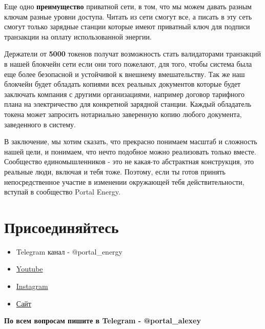 \documentclass[a4paper,12pt]{report}
\begin{document}
Еще одно \textbf{преимущество} приватной сети, в том, что мы можем давать разным ключам разные уровни доступа. Читать из сети смогут все, а писать в эту сеть смогут только зарядные станции которые имеют приватный ключ для подписи транзакции на оплату использованной энергии.

Держатели от \textbf{5000} токенов получат возможность стать валидаторами транзакций в нашей блокчейн сети если они того пожелают, для того, чтобы система была еще более безопасной и устойчивой к внешнему вмешательству. Так же наш блокчейн будет обладать копиями всех реальных документов которые будет заключать компания с другими организациями, например договор тарифного плана на электричество для конкретной зарядной станции.
Каждый обладатель токена может запросить нотариально заверенную копию любого документа, заведенного в систему.

В заключение, мы хотим сказать, что прекрасно понимаем масштаб и сложность нашей цели, и понимаем, что нечто подобное можно реализовать только вместе. Сообщество единомышленников - это не какая-то абстрактная конструкция, это реальные люди, включая и тебя тоже. Поэтому, если ты готов принять непосредственное участие в изменении окружающей тебя действительности, вступай в сообщество Portal Energy.


\chapter{Присоединяйтесь}

\begin{itemize}
	\item Telegram канал - @portal\_energy
	\item \href{https://www.youtube.com/channel/UCtPxyCkz73i78F9HChlO61w}{Youtube}
	\item \href{https://www.instagram.com/petr_roadrunner/}{Instagram}
	\item \href{https://portalenergy.tech}{Сайт}
\end{itemize}

\textbf{По всем вопросам пишите в Telegram - @portal\_alexey}
\end{document}
